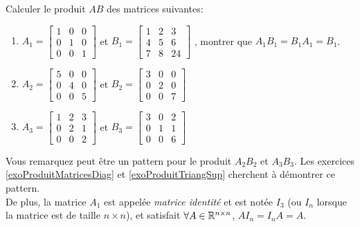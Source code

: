 \begin{exercice}
Calculer le produit $AB$ des matrices suivantes:
\begin{enumerate}
    \item $A_1 = \begin{bmatrix} 1 & 0 & 0 \\ 0 & 1 & 0 \\ 0 & 0 & 1 \end{bmatrix}$ et $B_1 = \begin{bmatrix} 1 & 2 & 3 \\ 4 & 5 & 6 \\ 7 & 8 & 24 \end{bmatrix}$ , montrer que $A_1 B_1 = B_1 A_1 = B_1$.
    \item $A_2 = \begin{bmatrix} 5 & 0 & 0 \\ 0 & 4 & 0 \\ 0 & 0 & 5 \end{bmatrix}$ et $B_2 = \begin{bmatrix} 3 & 0 & 0 \\ 0 & 2 & 0 \\ 0 & 0 & 7 \end{bmatrix}$ 
    \item $A_3 = \begin{bmatrix} 1 & 2 & 3 \\ 0 & 2 & 1 \\ 0 & 0 & 2 \end{bmatrix}$ et $B_3 = \begin{bmatrix} 3 & 0 & 2 \\ 0 & 1 & 1 \\ 0 & 0 & 6 \end{bmatrix}$
\end{enumerate}
Vous remarquez peut être un pattern pour le produit $A_2 B_2$ et $A_3 B_3$. Les exercices \ref{exoProduitMatricesDiag} et \ref{exoProduitTriangSup} cherchent à démontrer ce pattern. \\ 
De plus, la matrice $A_1$ est appelée \textit{matrice identité} et est notée $I_3$ (ou $I_n$ lorsque la matrice est de taille $n \times n$), et satisfait $\forall A \in \mathbb{R}^{n \times n}$, $A I_n = I_n A = A$. \\
\end{exercice}

